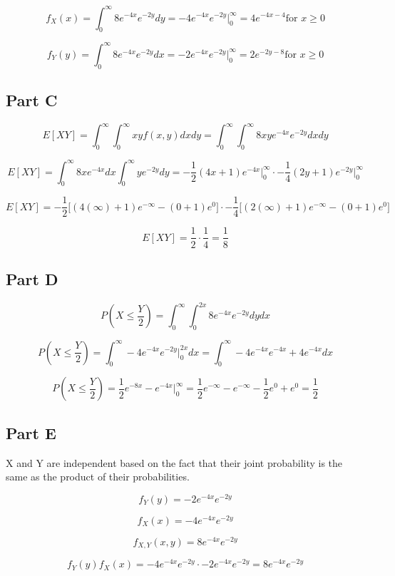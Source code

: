 \documentclass[letterpaper]{article}
\begin{document}
$$f_X(x) = \int_0^{\infty} 8e^{-4x}e^{-2y} dy = -4e^{-4x}e^{-2y} \Big|_0^{\infty} = 4e^{-4x-4} \text{for } x \geq 0$$

$$f_Y(y) = \int_0^{\infty} 8e^{-4x}e^{-2y} dx = -2e^{-4x}e^{-2y} \Big|_0^{\infty} = 2e^{-2y-8} \text{for } x \geq 0$$

\subsection*{Part C}

$$E[XY] = \int_0^{\infty} \int_0^{\infty} xy f(x, y) dx dy = \int_0^{\infty} \int_0^{\infty} 8xy e^{-4x}e^{-2y} dx dy$$

$$E[XY] = \int_0^{\infty} 8x e^{-4x} dx \int_0^{\infty} y e^{-2y}dy = -\frac{1}{2} (4x + 1) e^{-4x} \Big|_0^{\infty} \cdot -\frac{1}{4} (2y + 1) e^{-2y} \Big|_0^{\infty}$$

$$E[XY] = -\frac{1}{2} \Big[ (4(\infty) + 1) e^{-\infty} - (0 + 1) e^{0} \Big] \cdot -\frac{1}{4} \Big[ (2(\infty) + 1) e^{-\infty} - (0 + 1) e^{0} \Big]$$

$$E[XY] = \frac{1}{2} \cdot \frac{1}{4} = \frac{1}{8}$$

\subsection*{Part D}

$$P(X \leq \frac{Y}{2}) = \int_0^{\infty} \int_0^{2x} 8e^{-4x}e^{-2y} dy dx$$

$$P(X \leq \frac{Y}{2}) = \int_0^{\infty} -4e^{-4x}e^{-2y} \Big|_0^{2x} dx = \int_0^{\infty} -4e^{-4x}e^{-4x} + 4e^{-4x} dx$$

$$P(X \leq \frac{Y}{2}) = \frac{1}{2} e^{-8x} - e^{-4x} \Big|_0^{\infty} = \frac{1}{2} e^{-\infty} - e^{-\infty} - \frac{1}{2} e^{0} + e^{0} = \frac{1}{2}$$

\subsection*{Part E}

X and Y are independent based on the fact that their joint probability is the same as the product of their probabilities.

$$f_Y(y) = -2e^{-4x}e^{-2y}$$

$$f_X(x) = -4e^{-4x}e^{-2y}$$

$$f_{X, Y} (x, y) = 8e^{-4x}e^{-2y}$$

$$f_Y(y)f_X(x) = -4e^{-4x}e^{-2y} \cdot -2e^{-4x}e^{-2y} = 8e^{-4x}e^{-2y}$$
\end{document}
